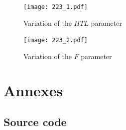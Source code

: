 \documentclass[11pt,a4paper]{scrartcl}
\begin{document}
\begin{figure}[t]
\label{fig:223-1}
\texttt{[image: 223\_1.pdf]}
\caption{Variation of the $HTL$ parameter}
\end{figure}

\begin{figure}[b]
\label{fig:223-2}
\texttt{[image: 223\_2.pdf]}
\caption{Variation of the $F$ parameter}
\end{figure}

\section{Annexes}

\subsection{Source code}

\end{document}
